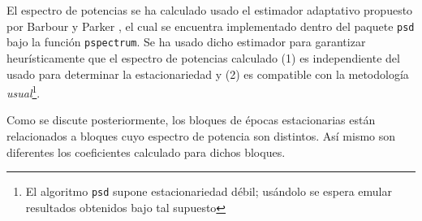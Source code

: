 El espectro de potencias se ha calculado usado el estimador adaptativo propuesto por
Barbour y Parker \cite{Barbour14}, el cual se encuentra implementado dentro del paquete
\texttt{psd} bajo la función \texttt{pspectrum}.
Se ha usado dicho estimador para garantizar heurísticamente que el espectro de potencias
calculado (1) es independiente del usado para determinar la estacionariedad y (2)
es compatible con la metodología \textit{usual}\footnote{El algoritmo \texttt{psd} 
supone estacionariedad débil; usándolo se espera emular resultados 
obtenidos bajo tal supuesto}.

Como se discute posteriormente, los bloques de épocas estacionarias están relacionados a bloques
cuyo espectro de potencia son distintos. Así mismo son diferentes los coeficientes \lento calculado
para dichos bloques.





